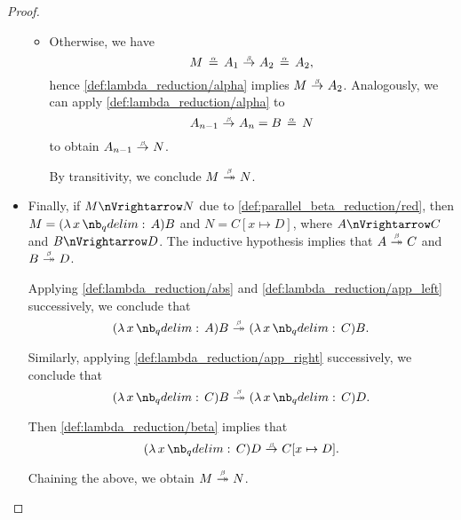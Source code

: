 \begin{proof}
\begin{itemize}
\begin{itemize}
      \item Otherwise, we have
      \begin{equation*}
        M \aequiv A_1 \bred A_2 \aequiv A_2,
      \end{equation*}
      hence \ref{def:lambda_reduction/alpha} implies \( M \bred A_2 \). Analogously, we can apply \ref{def:lambda_reduction/alpha} to
      \begin{equation*}
        A_{n-1} \bred A_n = B \aequiv N
      \end{equation*}
      to obtain \( A_{n-1} \bred N \).

      By transitivity, we conclude \( M \bred* N \).
    \end{itemize}

    \item Finally, if \( M \pred N \) due to \ref{def:parallel_beta_reduction/red}, then \( M = (\qabs x A)B \) and \( N = C[x \mapsto D] \), where \( A \pred C \) and \( B \pred D \). The inductive hypothesis implies that \( A \bred* C \) and \( B \bred* D \).

    Applying \ref{def:lambda_reduction/abs} and \ref{def:lambda_reduction/app_left} successively, we conclude that
    \begin{equation*}
      (\qabs x A) B \bred* (\qabs x C) B.
    \end{equation*}

    Similarly, applying \ref{def:lambda_reduction/app_right} successively, we conclude that
    \begin{equation*}
      (\qabs x C) B \bred* (\qabs x C) D.
    \end{equation*}

    Then \ref{def:lambda_reduction/beta} implies that
    \begin{equation*}
      (\qabs x C) D \bred C[x \mapsto D].
    \end{equation*}

    Chaining the above, we obtain \( M \bred* N \).
  \end{itemize}
\end{proof}

